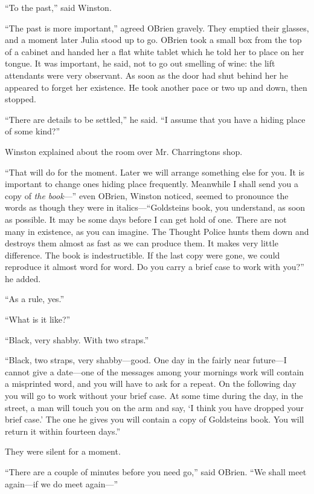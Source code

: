 ``To the past,'' said Winston.

``The past is more important,'' agreed O\textquotesingle Brien gravely.
They emptied their glasses, and a moment later Julia stood up to go.
O\textquotesingle Brien took a small box from the top of a cabinet and
handed her a flat white tablet which he told her to place on her tongue.
It was important, he said, not to go out smelling of wine: the lift
attendants were very observant. As soon as the door had shut behind her
he appeared to forget her existence. He took another pace or two up and
down, then stopped.

``There are details to be settled,'' he said. ``I assume that you have a
hiding place of some kind?''

Winston explained about the room over Mr. Charrington\textquotesingle s
shop.

``That will do for the moment. Later we will arrange something else for
you. It is important to change one\textquotesingle s hiding place
frequently. Meanwhile I shall send you a copy of \emph{the book}---''
even O\textquotesingle Brien, Winston noticed, seemed to pronounce the
words as though they were in italics---``Goldstein\textquotesingle s
book, you understand, as soon as possible. It may be some days before I
can get hold of one. There are not many in existence, as you can
imagine. The Thought Police hunts them down and destroys them almost as
fast as we can produce them. It makes very little difference. The book
is indestructible. If the last copy were gone, we could reproduce it
almost word for word. Do you carry a brief case to work with you?'' he
added.

``As a rule, yes.''

``What is it like?''

``Black, very shabby. With two straps.''

``Black, two straps, very shabby---good. One day in the fairly near
future---I cannot give a date---one of the messages among your
morning\textquotesingle s work will contain a misprinted word, and you
will have to ask for a repeat. On the following day you will go to work
without your brief case. At some time during the day, in the street, a
man will touch you on the arm and say, `I think you have
dropped your brief case.' The one he gives you will
contain a copy of Goldstein\textquotesingle s book. You will return it
within fourteen days.''

They were silent for a moment.

``There are a couple of minutes before you need go,'' said
O\textquotesingle Brien. ``We shall meet again---if we do meet again---''

